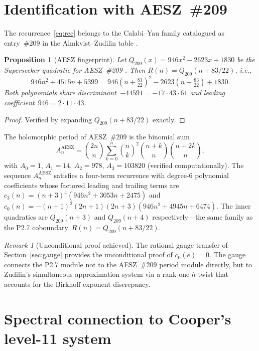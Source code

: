 \documentclass[11pt]{article}
\newtheorem{proposition}[theorem]{Proposition}
\theoremstyle{remark}
\newtheorem*{remark}{Remark}
\begin{document}
\section{Identification with AESZ~\#209}\label{sec:aesz}

The recurrence~\eqref{eq:rec} belongs to the Calabi--Yau
family catalogued as entry~\#209 in the Almkvist--Zudilin
table \cite{AESZ2005}.

\begin{proposition}[AESZ fingerprint]\label{prop:aesz}
Let $Q_{209}(x) = 946x^2 - 2623x + 1830$ be the Superseeker
quadratic for AESZ~\#209 \cite{Almkvist2006}. Then
$R(n) = Q_{209}(n + 83/22)$, i.e.,
\[
946n^2 + 4515n + 5399
= 946\!\left(n + \tfrac{83}{22}\right)^2
- 2623\!\left(n + \tfrac{83}{22}\right) + 1830.
\]
Both polynomials share discriminant~$-44591 = -17 \cdot 43 \cdot 61$
and leading coefficient~$946 = 2 \cdot 11 \cdot 43$.
\end{proposition}
\begin{proof}
Verified by expanding $Q_{209}(n + 83/22)$ exactly.
\end{proof}

The holomorphic period of AESZ~\#209 is the binomial sum
\begin{equation}\label{eq:aesz-period}
A_n^{\mathrm{AESZ}} = \binom{2n}{n}
\sum_{k=0}^{n}\binom{n}{k}^{\!2}
\binom{n+k}{n}\binom{n+2k}{n},
\end{equation}
with $A_0 = 1$, $A_1 = 14$, $A_2 = 978$, $A_3 = 103820$
(verified computationally). The sequence
$A_n^{\mathrm{AESZ}}$ satisfies a four-term recurrence with
degree-6 polynomial coefficients whose factored leading and
trailing terms are
$c_3(n) = (n+3)^4(946n^2 + 3053n + 2475)$
and
$c_0(n) = -(n+1)^2(2n+1)(2n+3)(946n^2 + 4945n + 6474)$.
The inner quadratics are
$Q_{209}(n+3)$ and $Q_{209}(n+4)$ respectively---the same
family as the P2.7 coboundary~$R(n) = Q_{209}(n+83/22)$.

\begin{remark}[Unconditional proof achieved]
The rational gauge transfer of Section~\ref{sec:gauge}
provides the unconditional proof of $c_0(e) = 0$.
The gauge connects the P2.7 module not to the AESZ~\#209
period module directly, but to Zudilin's simultaneous
approximation system \cite{Zudilin2004} via a rank-one
$h$-twist that accounts for the Birkhoff exponent discrepancy.
\end{remark}

\section{Spectral connection to Cooper's level-11
system}\label{sec:spectral}
\end{document}
